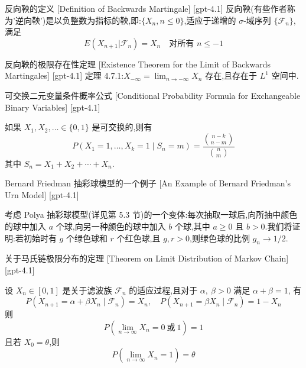 \documentclass[UTF8]{ctexart}
\begin{document}
    
    
    \begin{dfn}
        {反向鞅的定义}
        [Definition of Backwards Martingale]
        [gpt-4.1]
        反向鞅(有些作者称为'逆向鞅')是以负整数为指标的鞅,即:$\{X_n, n \leq 0\}$,适应于递增的 $\sigma$-域序列 $\{\mathcal{F}_n\}$,满足
\[
E(X_{n+1} | \mathcal{F}_n) = X_n \quad \text{对所有 } n \leq -1
\]

    \end{dfn}
    
    
    
    \begin{thm}
        {反向鞅的极限存在性定理}
        [Existence Theorem for the Limit of Backwards Martingales]
        [gpt-4.1]
        定理 4.7.1:$X_{-\infty} = \lim_{n \to -\infty} X_n$ 存在,且存在于 $L^1$ 空间中.
    \end{thm}
    
    
    
    \begin{thm}
        {可交换二元变量条件概率公式}
        [Conditional Probability Formula for Exchangeable Binary Variables]
        [gpt-4.1]
        
如果 $X_{1}, X_{2}, \dotsc \in \{0, 1\}$ 是可交换的,则有
\[
P(X_{1} = 1, \ldots, X_{k} = 1 \mid S_{n} = m) = \frac{\binom{n - k}{n - m}}{\binom{n}{m}}
\]
其中 $S_{n} = X_{1} + X_{2} + \cdots + X_{n}$.

    \end{thm}
    
    
    
    \begin{xmp}
        {Bernard Friedman 抽彩球模型的一个例子}
        [An Example of Bernard Friedman's Urn Model]
        [gpt-4.1]
        
考虑 Polya 抽彩球模型(详见第 5.3 节)的一个变体:每次抽取一球后,向所抽中颜色的球中加入 $a$ 个球,向另一种颜色的球中加入 $b$ 个球,其中 $a \geq 0$ 且 $b > 0$.我们将证明:若初始时有 $g$ 个绿色球和 $r$ 个红色球,且 $g, r > 0$,则绿色球的比例 $g_n \to 1/2$.

    \end{xmp}
    
    
    
    \begin{thm}
        {关于马氏链极限分布的定理}
        [Theorem on Limit Distribution of Markov Chain]
        [gpt-4.1]
        
设 $X_{n} \in [0,1]$ 是关于滤波族 ${\mathcal{F}}_{n}$ 的适应过程,且对于 $\alpha,\ \beta > 0$ 满足 $\alpha + \beta = 1$,
有
\[
P(X_{n+1} = \alpha + \beta X_{n} \mid \mathcal{F}_{n}) = X_{n},\quad P(X_{n+1} = \beta X_{n} \mid \mathcal{F}_{n}) = 1 - X_{n}
\]
则
\[
P\left(\lim_{n\to\infty} X_{n} = 0\ \text{或}\ 1\right) = 1
\]
且若 $X_{0} = \theta$,则
\[
P\left(\lim_{n\to\infty} X_{n} = 1\right) = \theta
\]

    \end{thm}
    
\end{document}
